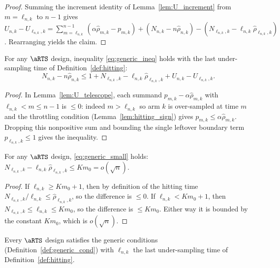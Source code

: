 \begin{proof}\leanok
{}
Summing the increment identity of Lemma~\ref{lem:U_increment} from
$m = \ell_{n,k}$ to $n-1$ gives
$U_{n,k} - U_{\ell_{n,k},k}
 = \sum_{m=\ell_{n,k}}^{n-1} (\alpha\hat{\rho}_{m,k} - p_{m,k})
   + (N_{n,k}-n\hat{\rho}_{n,k}) - (N_{\ell_{n,k},k}-\ell_{n,k}\hat{\rho}_{\ell_{n,k},k})$.
Rearranging yields the claim.
\end{proof}

\begin{lemma}\label{lem:preliminary_ineq}
\leanok
{}
For any $\aRTS$ design, inequality \eqref{eq:generic_ineq} holds with the last
under-sampling time of Definition~\ref{def:hitting}:
\[
  N_{n,k} - n\hat{\rho}_{n,k}
  \le 1 + N_{\ell_{n,k},k} - \ell_{n,k}\hat{\rho}_{\ell_{n,k},k}
    + U_{n,k} - U_{\ell_{n,k},k}.
\]
\end{lemma}

\begin{proof}\leanok
{}
In Lemma~\ref{lem:U_telescope}, each summand $p_{m,k} - \alpha\hat{\rho}_{m,k}$
with $\ell_{n,k} < m \le n-1$ is $\le 0$: indeed $m > \ell_{n,k}$ so arm $k$
is over-sampled at time $m$ and the throttling condition
(Lemma~\ref{lem:hitting_sign}) gives $p_{m,k} \le \alpha\hat{\rho}_{m,k}$.
Dropping this nonpositive sum and bounding the single leftover boundary term
$p_{\ell_{n,k},k} \le 1$ gives the inequality.
\end{proof}

\begin{lemma}\label{lem:preliminary_small}
\leanok
{}
For any $\aRTS$ design, \eqref{eq:generic_small} holds:
$N_{\ell_{n,k},k} - \ell_{n,k}\hat{\rho}_{\ell_{n,k},k} \le Km_0 = o(\sqrt n)$.
\end{lemma}

\begin{proof}
If $\ell_{n,k} \ge Km_0+1$, then by definition of the hitting time
$N_{\ell_{n,k},k}/\ell_{n,k} \le \hat{\rho}_{\ell_{n,k},k}$, so the difference is
$\le 0$. If $\ell_{n,k} < Km_0+1$, then $N_{\ell_{n,k},k} \le \ell_{n,k} \le Km_0$,
so the difference is $\le Km_0$. Either way it is bounded by the constant $Km_0$,
which is $o(\sqrt n)$.
\leanok
\end{proof}

\begin{proposition}\label{prop:aRTS_generic}
Every $\aRTS$ design satisfies the generic conditions
(Definition~\ref{def:generic_cond}) with $\ell_{n,k}$ the last under-sampling
time of Definition~\ref{def:hitting}.
\end{proposition}

